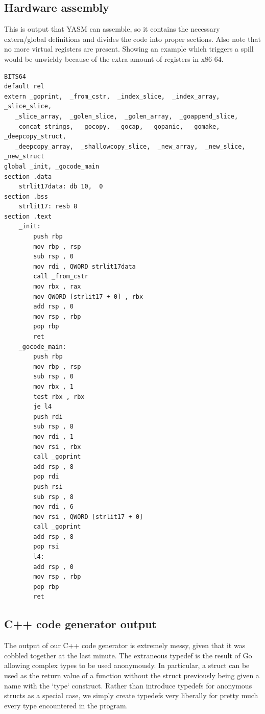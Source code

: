 \documentclass[letterpaper,11pt]{article}
\begin{document}
\subsection{Hardware assembly}
This is output that YASM can assemble, so it contains the necessary extern/global definitions and divides the code into proper sections. Also note that no more virtual registers are present. Showing an example which triggers a spill would be unwieldy because of the extra amount of registers in x86-64.
\begin{verbatim}
BITS64
default rel
extern _goprint,  _from_cstr,  _index_slice,  _index_array,  _slice_slice,
   _slice_array,  _golen_slice,  _golen_array,  _goappend_slice,
   _concat_strings,  _gocopy,  _gocap,  _gopanic,  _gomake,  _deepcopy_struct,
   _deepcopy_array,  _shallowcopy_slice,  _new_array,  _new_slice,  _new_struct
global _init, _gocode_main
section .data
    strlit17data: db 10,  0
section .bss
    strlit17: resb 8
section .text
    _init:
        push rbp
        mov rbp , rsp
        sub rsp , 0
        mov rdi , QWORD strlit17data
        call _from_cstr
        mov rbx , rax
        mov QWORD [strlit17 + 0] , rbx
        add rsp , 0
        mov rsp , rbp
        pop rbp
        ret
    _gocode_main:
        push rbp
        mov rbp , rsp
        sub rsp , 0
        mov rbx , 1
        test rbx , rbx
        je l4
        push rdi
        sub rsp , 8
        mov rdi , 1
        mov rsi , rbx
        call _goprint
        add rsp , 8
        pop rdi
        push rsi
        sub rsp , 8
        mov rdi , 6
        mov rsi , QWORD [strlit17 + 0]
        call _goprint
        add rsp , 8
        pop rsi
        l4:
        add rsp , 0
        mov rsp , rbp
        pop rbp
        ret
\end{verbatim}

\subsection{C++ code generator output}
The output of our C++ code generator is extremely messy, given that it was cobbled together at the last minute. The extraneous typedef is the result of Go allowing complex types to be used anonymously. In particular, a struct can be used as the return value of a function without the struct previously being given a name with the `type` construct. Rather than introduce typedefs for anonymous structs as a special case, we simply create typedefs very liberally for pretty much every type encountered in the program.
\end{document}
